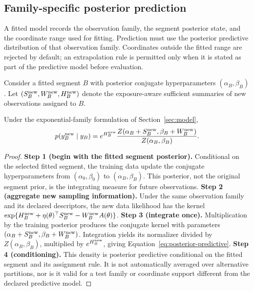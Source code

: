 \subsection{Family-specific posterior prediction}
A fitted model records the observation family, the segment posterior state, and the coordinate range used for fitting. Prediction must use the posterior predictive distribution of that observation family. Coordinates outside the fitted range are rejected by default; an extrapolation rule is permitted only when it is stated as part of the predictive model before evaluation.



Consider a fitted segment $B$ with posterior conjugate hyperparameters $(\alpha_B,\beta_B)$. Let $(S_B^{\rm new},W_B^{\rm new},H_B^{\rm new})$ denote the exposure-aware sufficient summaries of new observations assigned to $B$.

\begin{proposition}
\label{prop:predictive-paper}
Under the exponential-family formulation of Section~\ref{sec:model},
\begin{equation}
 p(y_B^{\rm new}\mid y_B)
 =e^{H_B^{\rm new}}
 \frac{Z(\alpha_B+S_B^{\rm new},\beta_B+W_B^{\rm new})}
      {Z(\alpha_B,\beta_B)}.
\label{eq:posterior-predictive}
\end{equation}
\end{proposition}
\begin{proof}
\textbf{Step 1 (begin with the fitted segment posterior).}
Conditional on the selected fitted segment, the training data update the conjugate hyperparameters from $(\alpha_0,\beta_0)$ to $(\alpha_B,\beta_B)$. This posterior, not the original segment prior, is the integrating measure for future observations.
\textbf{Step 2 (aggregate new sampling information).}
Under the same observation family and its declared descriptors, the new data likelihood has the kernel $\exp\{H_B^{\rm new}+\eta(\theta)^\top S_B^{\rm new}-W_B^{\rm new}A(\theta)\}$.
\textbf{Step 3 (integrate once).}
Multiplication by the training posterior produces the conjugate kernel with parameters $(\alpha_B+S_B^{\rm new},\beta_B+W_B^{\rm new})$. Integration yields its normalizer divided by $Z(\alpha_B,\beta_B)$, multiplied by $e^{H_B^{\rm new}}$, giving Equation~\eqref{eq:posterior-predictive}.
\textbf{Step 4 (conditioning).}
This density is posterior predictive conditional on the fitted segment and its assignment rule. It is not automatically averaged over alternative partitions, nor is it valid for a test family or coordinate support different from the declared predictive model.
\end{proof}

